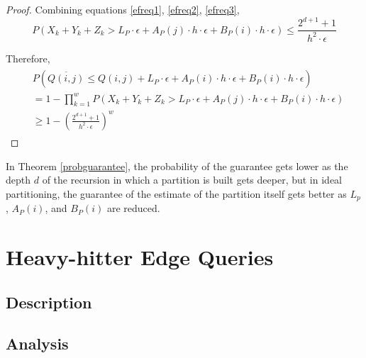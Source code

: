 \begin{proof}
Combining equations \ref{efreq1}, \ref{efreq2}, \ref{efreq3},
\begin{equation} \label{efreq4}
  P(X_k + Y_k + Z_k > L_P \cdot \epsilon + A_P(j) \cdot h \cdot \epsilon + B_P(i) \cdot h \cdot \epsilon) \leq \frac{2^{d+1}+1}{h^2\cdot\epsilon}
\end{equation}

Therefore,
\begin{align}
\begin{split}
&  P(\overline{Q(i,j)} \leq Q(i,j) + L_P \cdot \epsilon + A_P(i) \cdot h \cdot \epsilon + B_P(i) \cdot h \cdot \epsilon)
\\  &= 1 - \prod _{k=1}^{w}P(X_k + Y_k + Z_k > L_P \cdot \epsilon + A_P(j) \cdot h \cdot \epsilon + B_P(i) \cdot h \cdot \epsilon)
\\  &\geq 1-(\frac{2^{d+1}+1}{h^2\cdot\epsilon})^w
\end{split}
\end{align}

\end{proof}

\begin{remarks}
In Theorem \ref{probguarantee}, the probability of the guarantee gets lower as the depth $d$ of the recursion in which a partition is built gets deeper, but in ideal partitioning, the guarantee of the estimate of the partition itself gets better as $L_p$, $A_P(i)$, and $B_P(i)$ are reduced.
\end{remarks}


\section{Heavy-hitter Edge Queries}
\subsection{Description}
\subsection{Analysis}
